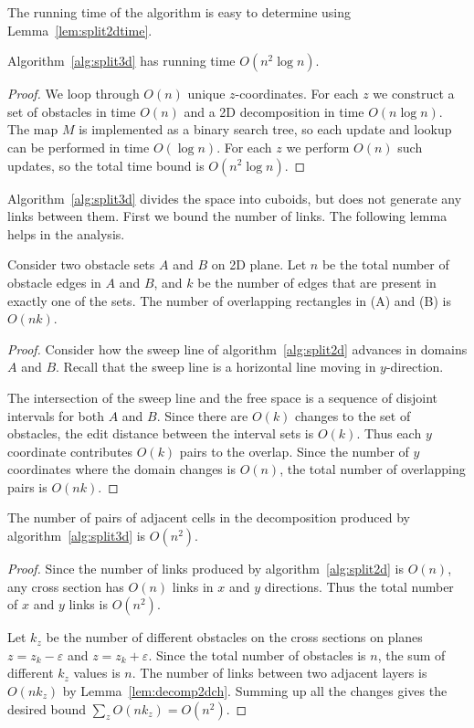 \documentclass[english,gradu]{tktltiki2018}
\begin{document}
The running time of the algorithm is easy to determine using Lemma~\ref{lem:split2dtime}.

\begin{lem}\label{lem:split3dtime}Algorithm~\ref{alg:split3d} has running time $O(n^2\log n)$.\end{lem}
\begin{proof}
We loop through $O(n)$ unique $z$-coordinates.
For each $z$ we construct a set of obstacles in time $O(n)$ and a 2D decomposition in time $O(n\log n)$.
The map $M$ is implemented as a binary search tree, so each update and lookup can be performed in time $O(\log n)$.
For each $z$ we perform $O(n)$ such updates, so the total time bound is $O(n^2\log n)$.
\end{proof}

Algorithm~\ref{alg:split3d} divides the space into cuboids, but does not generate any links between them.
First we bound the number of links.
The following lemma helps in the analysis.

\begin{lem}\label{lem:decomp2dch}
Consider two obstacle sets $A$ and $B$ on 2D plane.
Let $n$ be the total number of obstacle edges in $A$ and $B$, and $k$ be the number of edges that are present in exactly one of the sets.
The number of overlapping rectangles in (A) and (B) is $O(nk)$.
\end{lem}
\begin{proof}
Consider how the sweep line of algorithm~\ref{alg:split2d} advances in domains $A$ and $B$.
Recall that the sweep line is a horizontal line moving in $y$-direction.

The intersection of the sweep line and the free space is a sequence of disjoint intervals for both $A$ and $B$.
Since there are $O(k)$ changes to the set of obstacles, the edit distance between the interval sets is $O(k)$.
Thus each $y$ coordinate contributes $O(k)$ pairs to the overlap.
Since the number of $y$ coordinates where the domain changes is $O(n)$, the total number of overlapping pairs is $O(nk)$.
\end{proof}

\begin{lem}\label{lem:split3dcount}The number of pairs of adjacent cells in the decomposition produced by algorithm~\ref{alg:split3d} is $O(n^2)$.\end{lem}
\begin{proof}
Since the number of links produced by algorithm~\ref{alg:split2d} is $O(n)$, any cross section has $O(n)$ links in $x$ and $y$ directions.
Thus the total number of $x$ and $y$ links is $O(n^2)$.

Let $k_z$ be the number of different obstacles on the cross sections on planes $z=z_k-\varepsilon$ and $z=z_k+\varepsilon$.
Since the total number of obstacles is $n$, the sum of different $k_z$ values is $n$.
The number of links between two adjacent layers is $O(nk_z)$ by Lemma~\ref{lem:decomp2dch}.
Summing up all the changes gives the desired bound $\sum_z O(nk_z) = O(n^2)$.
\end{proof}
\end{document}
